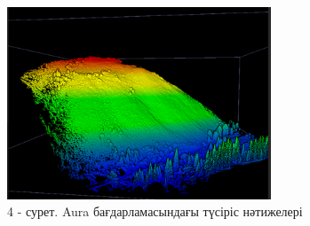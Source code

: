 \begin{figure}[H]
	\centering
	\includegraphics[width=0.7\textwidth]{media/ict2/image202}
	\caption*{4 - сурет. Aura бағдарламасындағы түсіріс нәтижелері}
\end{figure}

